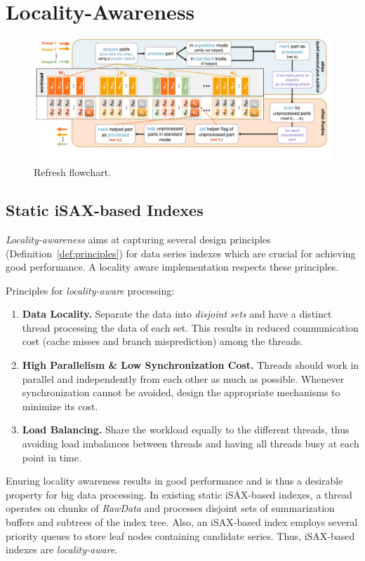 \chapter{Locality-Awareness}
\label{chapter:Locality-aware}

\begin{figure}[tb]
    \centering
    \includegraphics[width=\textheight,angle=90]{figures/locality-aware/Refresh_ekosmas_2-Themis.pdf}
    \caption{Refresh flowchart.}
	\label{fig:refresh:flowchart}
\end{figure}

\section{Static iSAX-based Indexes}

{\em Locality-awareness}  aims at capturing several design principles (Definition~\ref{def:principles})
for data series indexes which are crucial for achieving good performance.
A locality aware implementation respects these principles. 
% 
\begin{definition}
\label{def:principles}
Principles for {\em locality-aware} processing:
\begin{enumerate}
\item \normalfont
{\bf Data Locality.} Separate the data into {\em disjoint sets} and have a distinct thread
processing the data of each set. This results in reduced communication 
cost (cache misses and branch misprediction) among the threads.
\item \normalfont
{\bf High Parallelism \& Low Synchronization Cost.} 
Threads should work in parallel and independently from each other as much as possible. 
Whenever synchronization cannot be avoided, design the appropriate 
mechanisms to minimize its cost.
\item \normalfont
{\bf Load Balancing.} Share the workload equally to the different threads, thus
avoiding load imbalances between threads and having all threads busy at each
point in time. 

\end{enumerate}
\end{definition}
% 
Enuring locality awareness results in good performance and is thus 
a desirable property for big data processing. In existing static  iSAX-based indexes, 
a thread operates on chunks of \textit{RawData} and processes disjoint sets of summarization
buffers and subtrees of the index tree. Also, an iSAX-based index employs 
several priority queues to store leaf nodes containing candidate series.
Thus, iSAX-based indexes are {\em locality-aware}.

